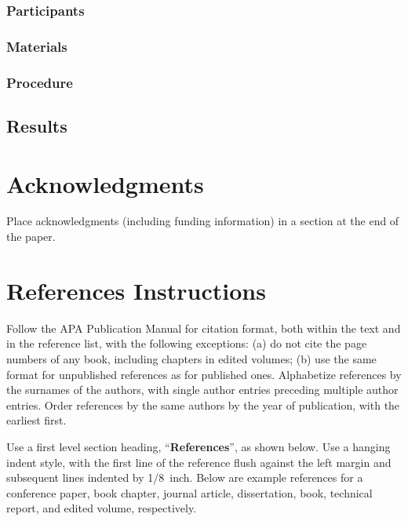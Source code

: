 \documentclass[10pt,letterpaper]{article}
\begin{document}
\subsubsection{Participants}
\subsubsection{Materials}
\subsubsection{Procedure}
\subsection{Results}


\section{Acknowledgments}

Place acknowledgments (including funding information) in a section at
the end of the paper.


\section{References Instructions}

Follow the APA Publication Manual for citation format, both within the
text and in the reference list, with the following exceptions: (a) do
not cite the page numbers of any book, including chapters in edited
volumes; (b) use the same format for unpublished references as for
published ones. Alphabetize references by the surnames of the authors,
with single author entries preceding multiple author entries. Order
references by the same authors by the year of publication, with the
earliest first.

Use a first level section heading, ``{\bf References}'', as shown
below. Use a hanging indent style, with the first line of the
reference flush against the left margin and subsequent lines indented
by 1/8~inch. Below are example references for a conference paper, book
chapter, journal article, dissertation, book, technical report, and
edited volume, respectively.



\setlength{\bibleftmargin}{.125in}
\setlength{\bibindent}{-\bibleftmargin}


\end{document}
